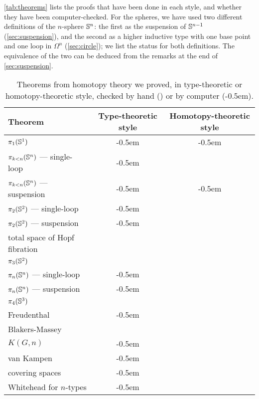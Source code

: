 \autoref{tab:theorems} lists the proofs that have been done in each style, and
whether they have been computer-checked.
For the spheres, we have used two different definitions of
the $n$-sphere $\mathbb{S} ^n$: the first as the suspension of $\mathbb{S} ^ {n-1}$ (\autoref{sec:suspension}),
and the second as a higher inductive type with one base point and one
loop in $\Omega^n$ (\autoref{sec:circle}); we list the status for both definitions.
The equivalence of the two can be deduced from the remarks at the end of \autoref{sec:suspension}.

{
\newcommand{\humancheck}{\ding{52}}
\newcommand{\computercheck}{\ding{52}\kern-0.5em\ding{52}}
\begin{table}[htb]
  \centering
\begin{tabular}{lcc}
\toprule
Theorem         & {\small Type-theoretic style} & {\small Homotopy-theoretic style} \\
\midrule
$\pi_1(\mathbb{S} ^1)$                     & \computercheck & \computercheck  \\
$\pi_{k<n}(\mathbb{S} ^n)$ --- single-loop & \computercheck &                 \\
$\pi_{k<n}(\mathbb{S} ^n)$ --- suspension  & \computercheck & \computercheck  \\
$\pi_2(\mathbb{S} ^2)$ --- single-loop     & \computercheck &                 \\
$\pi_2(\mathbb{S} ^2)$ --- suspension      & \computercheck & \humancheck     \\
total space of Hopf fibration       &                & \humancheck     \\
$\pi_3(\mathbb{S} ^2)$                     &                & \humancheck     \\
$\pi_n(\mathbb{S} ^n)$ --- single-loop     & \computercheck &                 \\
$\pi_n(\mathbb{S} ^n)$ --- suspension      & \computercheck & \humancheck     \\
$\pi_4(\mathbb{S} ^3)$                     &                & \humancheck     \\
Freudenthal                         & \computercheck & \humancheck     \\
Blakers-Massey                      & \humancheck    &                 \\
$K(G,n)$                            & \computercheck &                 \\
van Kampen                          & \computercheck &                 \\
covering spaces                     & \computercheck &                 \\
Whitehead for $n$-types             & \computercheck &                 \\                 
\bottomrule
\end{tabular}
\caption{Theorems from homotopy theory we proved, in type-theoretic or
  homotopy-theoretic style, checked by hand (\humancheck) or by computer (\computercheck).}
  \label{tab:theorems}
\end{table}
}

